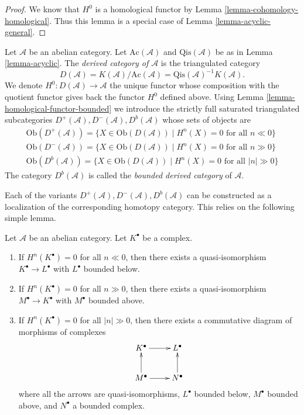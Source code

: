 \begin{proof}
We know that $H^0$ is a homological functor by
Lemma \ref{lemma-cohomology-homological}.
Thus this lemma is a special case of
Lemma \ref{lemma-acyclic-general}.
\end{proof}

\begin{definition}
\label{definition-unbounded-derived-category}
Let $\mathcal{A}$ be an abelian category.
Let $\text{Ac}(\mathcal{A})$ and $\text{Qis}(\mathcal{A})$
be as in
Lemma \ref{lemma-acyclic}.
The {\it derived category of $\mathcal{A}$} is the triangulated
category
$$
D(\mathcal{A}) =
K(\mathcal{A})/\text{Ac}(\mathcal{A}) =
\text{Qis}(\mathcal{A})^{-1} K(\mathcal{A}).
$$
We denote $H^0 : D(\mathcal{A}) \to \mathcal{A}$ the unique functor
whose composition with the quotient functor gives back the functor
$H^0$ defined above. Using
Lemma \ref{lemma-homological-functor-bounded}
we introduce the strictly full saturated triangulated subcategories
$D^{+}(\mathcal{A}), D^{-}(\mathcal{A}), D^b(\mathcal{A})$
whose sets of objects are
$$
\begin{matrix}
\text{Ob}(D^{+}(\mathcal{A})) =
\{X \in \text{Ob}(D(\mathcal{A})) \mid
H^n(X) = 0\text{ for all }n \ll 0\} \\
\text{Ob}(D^{-}(\mathcal{A})) =
\{X \in \text{Ob}(D(\mathcal{A})) \mid
H^n(X) = 0\text{ for all }n \gg 0\} \\
\text{Ob}(D^b(\mathcal{A})) =
\{X \in \text{Ob}(D(\mathcal{A})) \mid
H^n(X) = 0\text{ for all }|n| \gg 0\}
\end{matrix}
$$
The category $D^b(\mathcal{A})$ is called the {\it bounded derived
category} of $\mathcal{A}$.
\end{definition}

\noindent
Each of the variants $D^{+}(\mathcal{A}), D^{-}(\mathcal{A}), D^b(\mathcal{A})$
can be constructed as a localization of the corresponding homotopy category.
This relies on the following simple lemma.

\begin{lemma}
\label{lemma-complex-cohomology-bounded}
Let $\mathcal{A}$ be an abelian category.
Let $K^\bullet$ be a complex.
\begin{enumerate}
\item If $H^n(K^\bullet) = 0$ for all $n \ll 0$, then there exists
a quasi-isomorphism $K^\bullet \to L^\bullet$ with $L^\bullet$
bounded below.
\item If $H^n(K^\bullet) = 0$ for all $n \gg 0$, then there exists
a quasi-isomorphism $M^\bullet \to K^\bullet$ with $M^\bullet$
bounded above.
\item If $H^n(K^\bullet) = 0$ for all $|n| \gg 0$, then there exists
a commutative diagram of morphisms of complexes
$$
\xymatrix{
K^\bullet \ar[r] & L^\bullet \\
M^\bullet \ar[u] \ar[r] & N^\bullet \ar[u]
}
$$
where all the arrows are quasi-isomorphisms, $L^\bullet$
bounded below, $M^\bullet$ bounded above, and $N^\bullet$ a bounded
complex.
\end{enumerate}
\end{lemma}

